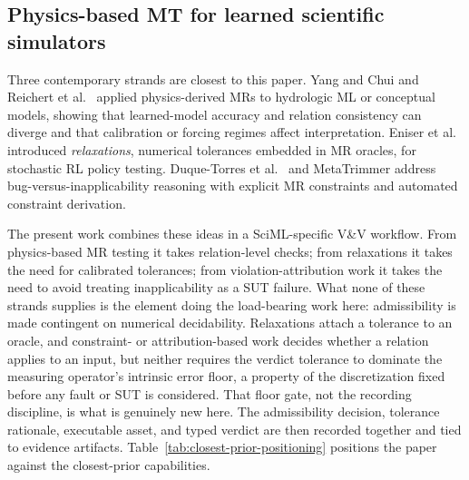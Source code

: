 \documentclass[preprint,12pt]{elsarticle}
\begin{document}
\subsection{Physics-based MT for learned scientific simulators}
\label{subsec:physics-mt}

Three contemporary strands are closest to this paper. Yang and Chui \citep{yang2021hydromt} and Reichert et al.~\citep{reichert2024hess} applied physics-derived MRs to hydrologic ML or conceptual models, showing that learned-model accuracy and relation consistency can diverge and that calibration or forcing regimes affect interpretation. Eniser et al.~\citep{eniser2022relaxations} introduced \emph{relaxations}, numerical tolerances embedded in MR oracles, for stochastic RL policy testing. Duque-Torres et al.~\citep{duqueTorres2023bugornot,duqueTorres2023completePipeline,duqueTorres2024selecting} and MetaTrimmer \citep{duqueTorres2023metaTrimmer} address bug-versus-inapplicability reasoning with explicit MR constraints and automated constraint derivation.

The present work combines these ideas in a SciML-specific V\&V workflow. From physics-based MR testing it takes relation-level checks; from relaxations it takes the need for calibrated tolerances; from violation-attribution work it takes the need to avoid treating inapplicability as a SUT failure. What none of these strands supplies is the element doing the load-bearing work here: admissibility is made contingent on numerical decidability. Relaxations attach a tolerance to an oracle, and constraint- or attribution-based work decides whether a relation applies to an input, but neither requires the verdict tolerance to dominate the measuring operator's intrinsic error floor, a property of the discretization fixed before any fault or SUT is considered. That floor gate, not the recording discipline, is what is genuinely new here. The admissibility decision, tolerance rationale, executable asset, and typed verdict are then recorded together and tied to evidence artifacts. Table~\ref{tab:closest-prior-positioning} positions the paper against the closest-prior capabilities.
\end{document}
